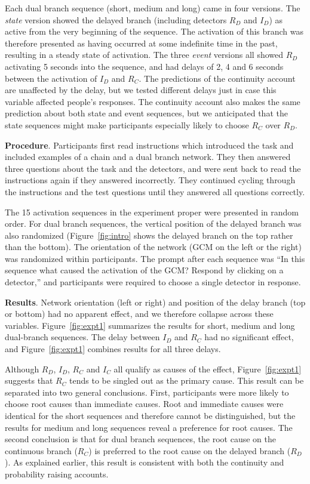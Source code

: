 \documentclass[10pt,letterpaper]{article}
\newcommand{\ev}[2]{$#1_#2$}
\begin{document}
Each dual branch sequence (short, medium and long) came in four versions. The \emph{state} version showed the delayed branch (including detectors \ev{R}{D} and \ev{I}{D}) as active from the very beginning of the sequence. The activation of this branch was therefore presented as having occurred at some indefinite time in the past, resulting in a steady state of activation. The three \emph{event} versions all showed \ev{R}{D} activating 5 seconds into the sequence, and had delays of 2, 4 and 6 seconds between the activation of \ev{I}{D} and \ev{R}{C}. The predictions of the continuity account are unaffected by the delay, but we tested different delays just in case this variable affected people's responses. The continuity account also makes the same prediction about both state and event sequences, but we anticipated that the state sequences might make participants especially likely to choose \ev{R}{C} over \ev{R}{D}.

\textbf{Procedure}. 
Participants first read instructions which introduced the task and included examples of a chain and a dual branch network. They then answered three questions about the task and the detectors, and were sent back to read the instructions again if they answered incorrectly. They continued cycling through the instructions and the test questions until they answered all questions correctly.

The 15 activation sequences in the experiment proper were presented in random order. For dual branch sequences, the vertical position of the delayed branch was also randomized (Figure~\ref{fig:intro} shows the delayed branch on the top rather than the bottom). The orientation of the network (GCM on the left or the right) was randomized within participants.  The prompt after each sequence was ``In this sequence what caused the activation of the GCM? Respond by clicking on a detector,'' and participants were required to choose a single detector in response. 

\textbf{Results}. 
Network orientation (left or right) and position of the delay branch (top or bottom) had no apparent effect, and we therefore collapse across these variables. Figure~\ref{fig:expt1} summarizes the results for short, medium and long dual-branch sequences. The delay between \ev{I}{D} and \ev{R}{C} had no significant effect, and Figure~\ref{fig:expt1} combines results for all three delays.  

Although \ev{R}{D}, \ev{I}{D}, \ev{R}{C} and \ev{I}{C} all qualify as causes of the effect, Figure~\ref{fig:expt1} suggests that \ev{R}{C} tends to be singled out as the primary cause. This result can be separated into two general conclusions.  First,  participants were more likely to choose root causes than immediate causes. Root and immediate causes were identical for the short sequences and therefore cannot be distinguished, but the results for medium and long sequences reveal a preference for root causes.  The second conclusion is that for dual branch sequences, the root cause on the continuous branch (\ev{R}{C}) is preferred to the root cause on the delayed branch (\ev{R}{D}). As explained earlier, this result is consistent with both the continuity and probability raising accounts. 
\end{document}
